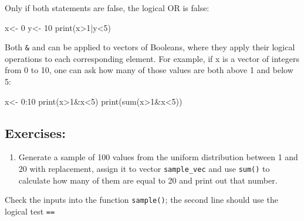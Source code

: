 \documentclass[
  letterpaper,
  DIV=11,
  numbers=noendperiod]{scrreprt}
\newenvironment{Shaded}{\begin{snugshade}}{\end{snugshade}}
\newcommand{\NormalTok}[1]{\textcolor[rgb]{0.00,0.23,0.31}{#1}}
\providecommand{\tightlist}{%
  \setlength{\itemsep}{0pt}\setlength{\parskip}{0pt}}\usepackage{longtable,booktabs,array}
\begin{document}
Only if both statements are false, the logical OR is false:

\begin{Shaded}
\begin{Highlighting}[]
\NormalTok{x\textless{}{-} 0}
\NormalTok{y\textless{}{-} 10}
\NormalTok{print(x\textgreater{}1|y\textless{}5)}
\end{Highlighting}
\end{Shaded}

Both \texttt{\&} and \texttt{\textbar{}} can be applied to vectors of
Booleans, where they apply their logical operations to each
corresponding element. For example, if x is a vector of integers from 0
to 10, one can ask how many of those values are both above 1 and below
5:

\begin{Shaded}
\begin{Highlighting}[]
\NormalTok{x\textless{}{-} 0:10}
\NormalTok{print(x\textgreater{}1\&x\textless{}5)}
\NormalTok{print(sum(x\textgreater{}1\&x\textless{}5))}
\end{Highlighting}
\end{Shaded}

\hypertarget{exercises-29}{%
\subsection*{Exercises:}\label{exercises-29}}

\begin{enumerate}
\def\labelenumi{\arabic{enumi}.}
\tightlist
\item
  Generate a sample of 100 values from the uniform distribution between
  1 and 20 with replacement, assign it to vector \texttt{sample\_vec}
  and use \texttt{sum()} to calculate how many of them are equal to 20
  and print out that number.
\end{enumerate}

\begin{Shaded}
\begin{Highlighting}[]

\end{Highlighting}
\end{Shaded}

\begin{tcolorbox}[enhanced jigsaw, arc=.35mm, colframe=quarto-callout-caution-color-frame, left=2mm, opacitybacktitle=0.6, breakable, title=\textcolor{quarto-callout-caution-color}{\faFire}\hspace{0.5em}{Hint}, toprule=.15mm, coltitle=black, bottomtitle=1mm, toptitle=1mm, colback=white, leftrule=.75mm, colbacktitle=quarto-callout-caution-color!10!white, titlerule=0mm, opacityback=0, rightrule=.15mm, bottomrule=.15mm]

Check the inputs into the function \texttt{sample()}; the second line
should use the logical test \texttt{==}

\end{tcolorbox}
\end{document}
